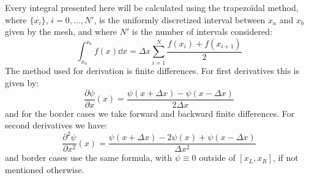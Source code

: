 Every integral presented here will be calculated using the trapezoïdal method, where \(\{x_i\}\), \(i = 0, \dots, N'\), is the uniformly discretized interval between \(x_a\) and \(x_b\) given by the mesh, and where \(N'\) is the number of intervals considered:
\begin{equation}
    \int_{x_a}^{x_b} f(x) \dd x = \Delta x \sum_{i=1}^N \frac{f(x_i) + f(x_{i+1})}{2}
\end{equation}
The method used for derivation is finite differences. For first derivatives this is given by:
\begin{equation}
    \frac{\partial \psi}{\partial x}(x) = \frac{\psi(x+\Delta x) - \psi(x - \Delta x)}{2\Delta x}
\end{equation}
and for the border cases we take forward and backward finite differences. For second derivatives we have:
\begin{equation}
    \frac{\partial^2 \psi}{\partial x^2}(x) = \frac{\psi(x+\Delta x) - 2\psi(x) + \psi(x - \Delta x)}{\Delta x^2}
    \label{eq:second_derivative}
\end{equation}
and border cases use the same formula, with $\psi \equiv 0$ outside of $[x_L,x_R]$, if not mentioned otherwise.

